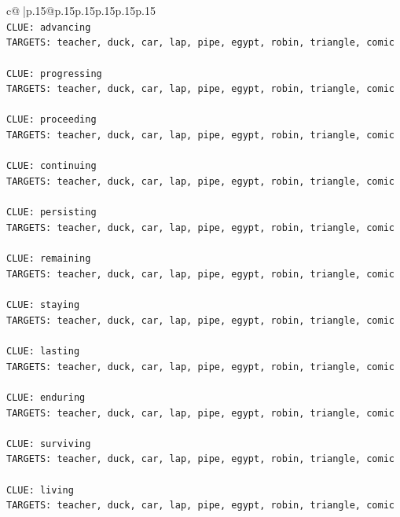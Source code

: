 \documentclass{article}
\begin{document}
{\begin{supertabular}{c@{$\;$}|p{.15\linewidth}@{}p{.15\linewidth}p{.15\linewidth}p{.15\linewidth}p{.15\linewidth}p{.15\linewidth}}
{{{\\ 
\texttt{CLUE: advancing} \\
\texttt{TARGETS: teacher, duck, car, lap, pipe, egypt, robin, triangle, comic} \\
\\ 
\texttt{CLUE: progressing} \\
\texttt{TARGETS: teacher, duck, car, lap, pipe, egypt, robin, triangle, comic} \\
\\ 
\texttt{CLUE: proceeding} \\
\texttt{TARGETS: teacher, duck, car, lap, pipe, egypt, robin, triangle, comic} \\
\\ 
\texttt{CLUE: continuing} \\
\texttt{TARGETS: teacher, duck, car, lap, pipe, egypt, robin, triangle, comic} \\
\\ 
\texttt{CLUE: persisting} \\
\texttt{TARGETS: teacher, duck, car, lap, pipe, egypt, robin, triangle, comic} \\
\\ 
\texttt{CLUE: remaining} \\
\texttt{TARGETS: teacher, duck, car, lap, pipe, egypt, robin, triangle, comic} \\
\\ 
\texttt{CLUE: staying} \\
\texttt{TARGETS: teacher, duck, car, lap, pipe, egypt, robin, triangle, comic} \\
\\ 
\texttt{CLUE: lasting} \\
\texttt{TARGETS: teacher, duck, car, lap, pipe, egypt, robin, triangle, comic} \\
\\ 
\texttt{CLUE: enduring} \\
\texttt{TARGETS: teacher, duck, car, lap, pipe, egypt, robin, triangle, comic} \\
\\ 
\texttt{CLUE: surviving} \\
\texttt{TARGETS: teacher, duck, car, lap, pipe, egypt, robin, triangle, comic} \\
\\ 
\texttt{CLUE: living} \\
\texttt{TARGETS: teacher, duck, car, lap, pipe, egypt, robin, triangle, comic} \\
\\ 
}}}
\end{supertabular}}
\end{document}
